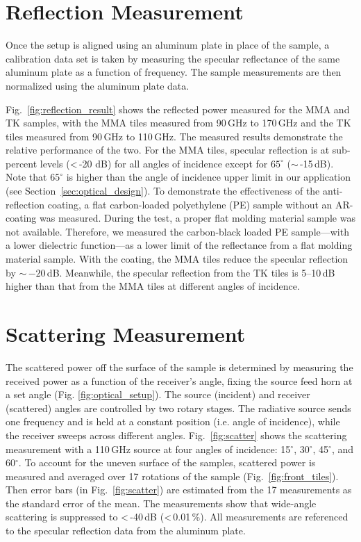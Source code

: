 \section{Reflection Measurement}

Once the setup is aligned using an aluminum plate in place of the sample, a calibration data set is taken by measuring the specular reflectance of the same aluminum plate as a function of frequency. The sample measurements are then normalized using the aluminum plate data. 

Fig.~\ref{fig:reflection_result} shows the reflected power measured for the MMA and TK samples, with the MMA tiles measured from 90\,GHz to 170\,GHz and the TK tiles measured from 90\,GHz to 110\,GHz. The measured results demonstrate the relative performance of the two. For the MMA tiles, specular reflection is at sub-percent levels (<\,-20 dB) for all angles of incidence except for $65^{\circ}$ ($\sim$\,-15\,dB). Note that $65^{\circ}$ is higher than the angle of incidence upper limit in our application (see Section~\ref{sec:optical_design}). To demonstrate the effectiveness of the anti-reflection coating, a flat carbon-loaded polyethylene (PE) sample without an AR-coating was measured. During the test, a proper flat molding material sample was not available. Therefore, we measured the carbon-black loaded PE sample---with a lower dielectric function---as a lower limit of the reflectance from a flat molding material sample. With the coating, the MMA tiles reduce the specular reflection by $\sim$\,$-20$\,dB. Meanwhile, the specular reflection from the TK tiles is 5--10\,dB higher than that from the MMA tiles at different angles of incidence.


\section{Scattering Measurement}

The scattered power off the surface of the sample is determined by measuring the received power as a function of the receiver's angle, fixing the source feed horn at a set angle (Fig. \ref{fig:optical_setup}). The source (incident) and receiver (scattered) angles are controlled by two rotary stages. The radiative source sends one frequency and is held at a constant position (i.e. angle of incidence), while the receiver sweeps across different angles. Fig.~\ref{fig:scatter} shows the scattering measurement with a 110\,GHz source at four angles of incidence: 15$^{\circ}$, 30$^{\circ}$, 45$^{\circ}$, and 60$^{\circ}$. To account for the uneven surface of the samples, scattered power is measured and averaged over 17 rotations of the sample (Fig.~\ref{fig:front_tiles}). Then error bars (in Fig.~\ref{fig:scatter}) are estimated from the 17 measurements as the standard error of the mean. The measurements show that wide-angle scattering is suppressed to <\,-40\,dB (<\,0.01\,\%). All measurements are referenced to the specular reflection data from the aluminum plate. 


